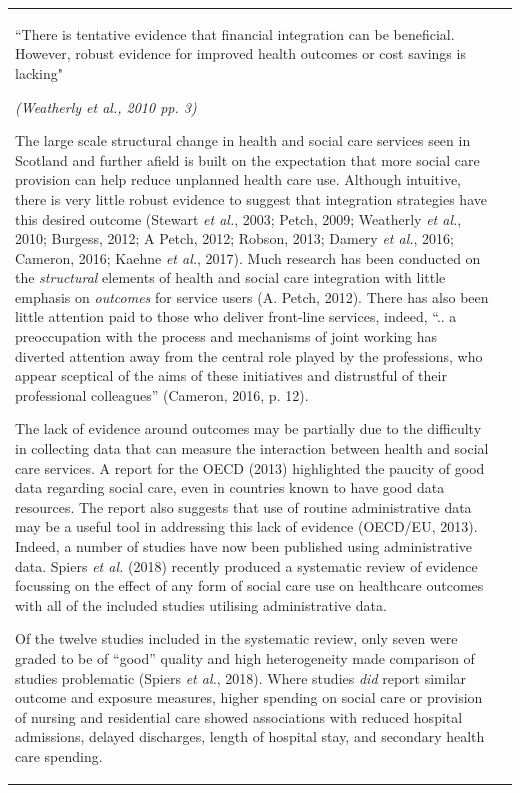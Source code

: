 \documentclass[12pt,a4paper,oneside,table]{report}
\begin{document}
\begin{tabular}[t]{ll}
\epigraph{``There is tentative evidence that financial integration can be beneficial. However, robust evidence for improved health outcomes or cost savings is lacking"}{\textit{(Weatherly \textit{et al.}, 2010 pp. 3)}}

The large scale structural change in health and social care services
seen in Scotland and further afield is built on the expectation that
more social care provision can help reduce unplanned health care use.
Although intuitive, there is very little robust evidence to suggest that
integration strategies have this desired outcome (Stewart \emph{et al.},
2003; Petch, 2009; Weatherly \emph{et al.}, 2010; Burgess, 2012; A
Petch, 2012; Robson, 2013; Damery \emph{et al.}, 2016; Cameron, 2016;
Kaehne \emph{et al.}, 2017). Much research has been conducted on the
\textit{structural} elements of health and social care integration with
little emphasis on \textit{outcomes} for service users (A. Petch, 2012).
There has also been little attention paid to those who deliver
front-line services, indeed, ``.. a preoccupation with the process and
mechanisms of joint working has diverted attention away from the central
role played by the professions, who appear sceptical of the aims of
these initiatives and distrustful of their professional colleagues''
(Cameron, 2016, p. 12).

The lack of evidence around outcomes may be partially due to the
difficulty in collecting data that can measure the interaction between
health and social care services. A report for the OECD (2013)
highlighted the paucity of good data regarding social care, even in
countries known to have good data resources. The report also suggests
that use of routine administrative data may be a useful tool in
addressing this lack of evidence (OECD/EU, 2013). Indeed, a number of
studies have now been published using administrative data. Spiers
\textit{et al.} (2018) recently produced a systematic review of evidence
focussing on the effect of any form of social care use on healthcare
outcomes with all of the included studies utilising administrative data.

Of the twelve studies included in the systematic review, only seven were
graded to be of ``good'' quality and high heterogeneity made comparison
of studies problematic (Spiers \emph{et al.}, 2018). Where studies
\emph{did} report similar outcome and exposure measures, higher spending
on social care or provision of nursing and residential care showed
associations with reduced hospital admissions, delayed discharges,
length of hospital stay, and secondary health care spending.


\end{tabular}
\end{document}
